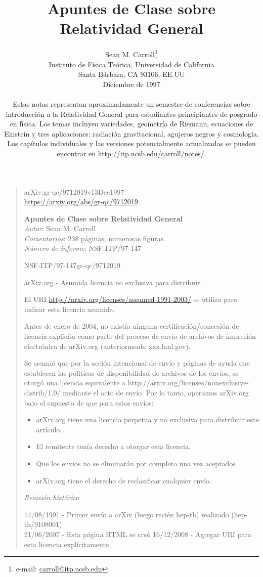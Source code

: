 \documentclass[11pt,b5paper,openany,twoside]{book}
\title{\textcolor{GrisAzul}{{\Huge \textbf{Apuntes de Clase sobre\\[6mm] Relatividad General}}}}
\author{Sean M. Carroll\hspace{2pt}\thanks{e-mail: \href{carroll@itp.ucsb.edu}{carroll@itp.ucsb.edu}} \\[14mm]
Instituto de Física Teórica, Universidad de California \\
Santa Bárbara, CA 93106, EE.UU \\[2mm]
Diciembre de 1997 \\[10mm]
\parbox{10.6cm}{Estas notas representan aproximadamente un semestre de conferencias sobre introducción a la Relatividad General para estudiantes principiantes de posgrado en física.
Los temas incluyen variedades, geometría de Riemann, ecuaciones de Einstein y tres aplicaciones: radiación gravitacional, agujeros negros y cosmología.
Los capítulos individuales y las versiones potencialmente actualizadas se pueden encontrar en \href{http://itp.ucsb.edu/carroll/notes/}{http://itp.ucsb.edu/carroll/notes/}.}
}
\date{}
\begin{document}


\noindent

\thispagestyle{plain}

\frontmatter

\maketitle

\begin{quote}
{\footnotesize
\noindent
arXiv:gr-qc/9712019v13Dec1997 \\ \href{https://arxiv.org/abs/gr-qc/9712019}{https://arxiv.org/abs/gr-qc/9712019}

\noindent
\textbf{Apuntes de Clase sobre Relatividad General}\\
\textit{Autor}: Sean M. Carroll \\
\textit{Comentarios}: 238 páginas, numerosas figuras. \\
\textit{Número de informe}: NSF-ITP/97-147

{{NSF-ITP/97-147}\hfill{gr-qc/9712019}}


arXiv.org - Asumida licencia no exclusiva para distribuir.

El URI \href{http://arxiv.org/licenses/assumed-1991-2003/}{http://arxiv.org/licenses/assumed-1991-2003/} se utiliza para indicar esta licencia asumida.

Antes de enero de 2004, no existía ninguna certificación/concesión de licencia explícita como parte del proceso de envío de archivos de impresión electrónica de arXiv.org (anteriormente xxx.lanl.gov).

Se asumió que por la acción intencional de envío y páginas de ayuda que establecen las políticas de disponibilidad de archivos de los envíos, se otorgó una licencia equivalente a http://arxiv.org/licenses/nonexclusive-distrib/1.0/ mediante el acto de envío. Por lo tanto, operamos arXiv.org bajo el supuesto de que para estos envíos:

\begin{itemize}
\item arXiv.org tiene una licencia perpetua y no exclusiva para distribuir este artículo.
\item El remitente tenía derecho a otorgar esta licencia.
\item Que los envíos no se eliminarán por completo una vez aceptados.
\item arXiv.org tiene el derecho de reclasificar cualquier envío.
\end{itemize}

\textit{Revisión histórica}

14/08/1991 - Primer envío a arXiv (luego recién hep-th) realizado (hep-th/9108001)\\
21/06/2007 - Esta página HTML se creó 16/12/2008 - Agregar URI para esta licencia explícitamente
}
\end{quote}
\end{document}
